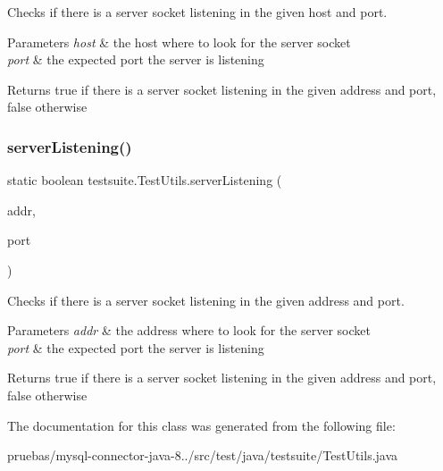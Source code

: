 Checks if there is a server socket listening in the given host and port.


\begin{DoxyParams}{Parameters}
{\em host} & the host where to look for the server socket \\
\hline
{\em port} & the expected port the server is listening \\
\hline
\end{DoxyParams}
\begin{DoxyReturn}{Returns}
true if there is a server socket listening in the given address and port, false otherwise 
\end{DoxyReturn}
\mbox{\label{classtestsuite_1_1_test_utils_a12975c2246ae1be20b9352ad1cff9460}} 
\subsubsection{\texorpdfstring{server\+Listening()}{serverListening()}\hspace{0.1cm}{\footnotesize\ttfamily [2/2]}}
{\footnotesize\ttfamily static boolean testsuite.\+Test\+Utils.\+server\+Listening (\begin{DoxyParamCaption}\item[{Inet\+Address}]{addr,  }\item[{int}]{port }\end{DoxyParamCaption})\hspace{0.3cm}{\ttfamily [static]}}

Checks if there is a server socket listening in the given address and port.


\begin{DoxyParams}{Parameters}
{\em addr} & the address where to look for the server socket \\
\hline
{\em port} & the expected port the server is listening \\
\hline
\end{DoxyParams}
\begin{DoxyReturn}{Returns}
true if there is a server socket listening in the given address and port, false otherwise 
\end{DoxyReturn}


The documentation for this class was generated from the following file\+:\begin{DoxyCompactItemize}
\item 
pruebas/mysql-\/connector-\/java-\/8../src/test/java/testsuite/Test\+Utils.\+java\end{DoxyCompactItemize}
